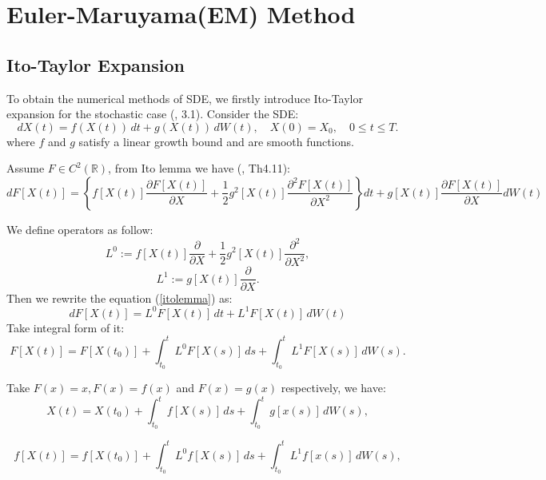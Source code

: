 \documentclass[12pt,a4paper]{article}
\newcommand{\R}{\mathbb{R}}
\theoremstyle{definition}
\begin{document}
\section{Euler-Maruyama(EM) Method}
\subsection{Ito-Taylor Expansion}
To obtain the numerical methods of SDE, we firstly introduce Ito-Taylor expansion for the stochastic case (\cite{bayram}, 3.1). Consider the SDE:\begin{equation}
    \label{333}
    dX(t) = f(X(t))\, dt + g(X(t))\, dW(t),\quad X(0)=X_0, \quad 0\le t\le T.
\end{equation}
where $f$ and $g$ satisfy a linear growth bound and are smooth functions.

Assume $F\in C^2(\R)$, from Ito lemma we have (\cite{bjork}, Th4.11):\begin{equation}
    \label{itolemma}dF[X(t)]=\left\{f[X(t)]\frac{\partial F[X(t)]}{\partial X}+\frac{1}{2}g^2[X(t)]\frac{\partial^2F[X(t)]}{\partial X^2} \right\}dt+g[X(t)]\frac{\partial F[X(t)]}{\partial X} dW(t)
\end{equation}

We define operators as follow:
\begin{equation}
    \label{L0}L^0:=f[X(t)]\frac{\partial }{\partial X}+\frac{1}{2}g^2[X(t)]\frac{\partial^2}{\partial X^2},
\end{equation}
\begin{equation}
    \label{L1}L^1:=g[X(t)]\frac{\partial }{\partial X} .
\end{equation}
Then we rewrite the equation (\ref{itolemma}) as:
\begin{equation}
    \label{ito2}
    dF[X(t)]=L^0 F[X(t)]\, dt+L^1F[X(t)]\, dW(t)
\end{equation}
Take integral form of it:
\begin{equation}
    \label{ito3}
    F[X(t)]=F[X(t_0)]+\int_{t_0}^t L^0 F[X(s)]\,ds+\int_{t_0}^t L^1 F[X(s)]\, dW(s).
\end{equation}

Take $F(x)=x, F(x)=f(x)$ and $F(x)=g(x)$ respectively, we have:
\begin{equation}
    \label{eq9}X(t)=X(t_0)+\int_{t_0}^t f[X(s)]\,ds+\int_{t_0}^t g[x(s)]\, dW(s),
\end{equation}

\begin{equation}
    \label{eq10}f[X(t)]=f[X(t_0)]+\int_{t_0}^t L^0 f[X(s)]\,ds+\int_{t_0}^t L^1 f[x(s)]\, dW(s),
\end{equation}
\end{document}
